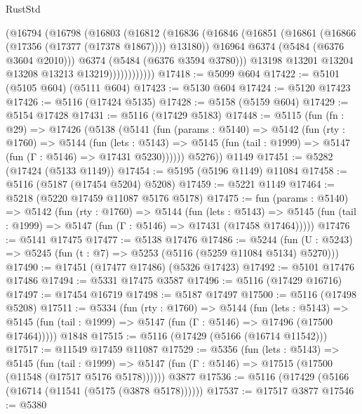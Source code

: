 \begin{lexlean}{RustStd}
\begin{coremodule}
{\begin{coremodule}
{{{{{{{{{{{{{{{{{{{{{{{{{{{{{{{                    (@16794
                      (@16798
                        (@16803
                          (@16812
                            (@16836
                              (@16846
                                (@16851 (@16861 (@16866 (@17356 (@17377 (@17378 @1867)))) @13180))
                                @16964
                                @6374
                                (@5484 (@6376 @3604 @2010)))
                              @6374
                              (@5484 (@6376 @3594 @3780)))
                            @13198
                            @13201
                            @13204
                            @13208
                            @13213
                            @13219))))))))))))
@17418 := @5099 @604
@17422 := @5101 (@5105 @604) (@5111 @604)
@17423 := @5130 @604
@17424 := @5120 @17423
@17426 := @5116 (@17424 @5135)
@17428 := @5158 (@5159 @604)
@17429 := @5154 @17428
@17431 := @5116 (@17429 @5183)
@17448 := @5115
    (fun (fn : @29) =>
    @17426
      (@5138
        (@5141
          (fun (params : @5140) =>
          @5142
            (fun (rty : @1760) =>
            @5144
              (fun (lets : @5143) =>
              @5145 (fun (tail : @1999) => @5147 (fun (Γ : @5146) => @17431 @5230))))))
        @5276))
    @1149
@17451 := @5282 (@17424 (@5133 @1149))
@17454 := @5195 (@5196 @1149) @11084
@17458 := @5116 (@5187 (@17454 @5204) @5208)
@17459 := @5221 @1149
@17464 := @5218 (@5220 @17459 @11087 @5176 @5178)
@17475 := fun (params : @5140) =>
  @5142
    (fun (rty : @1760) =>
    @5144
      (fun (lets : @5143) =>
      @5145 (fun (tail : @1999) => @5147 (fun (Γ : @5146) => @17431 (@17458 @17464)))))
@17476 := @5141 @17475
@17477 := @5138 @17476
@17486 := @5244
    (fun (U : @5243) => @5245 (fun (t : @7) => @5253 (@5116 (@5259 @11084 @5134) @5270)))
@17490 := @17451 (@17477 @17486) (@5326 @17423)
@17492 := @5101 @17476 @17486
@17494 := @5331 @17475 @3587
@17496 := @5116 (@17429 @16716)
@17497 := @17454 @16719
@17498 := @5187 @17497
@17500 := @5116 (@17498 @5208)
@17511 := @5334
    (fun (rty : @1760) =>
    @5144
      (fun (lets : @5143) =>
      @5145 (fun (tail : @1999) => @5147 (fun (Γ : @5146) => @17496 (@17500 @17464)))))
    @1848
@17515 := @5116 (@17429 (@5166 (@16714 @11542)))
@17517 := @11549 @17459 @11087
@17529 := @5356
    (fun (lets : @5143) =>
    @5145
      (fun (tail : @1999) =>
      @5147 (fun (Γ : @5146) => @17515 (@17500 (@11548 (@17517 @5176 @5178))))))
    @3877
@17536 := @5116 (@17429 (@5166 (@16714 (@11541 (@5175 (@3878 @5178))))))
@17537 := @17517 @3877
@17546 := @5380
}}}}}}}}}}}}}}}}}}}}}}}}}}}}}}}
\end{coremodule}}
\end{coremodule}
\end{lexlean}

